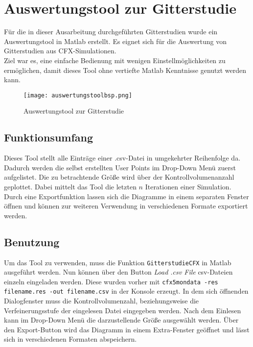 \chapter{Auswertungstool zur Gitterstudie}
\label{cha:auswertungstool}
Für die in dieser Ausarbeitung durchgeführten Gitterstudien wurde ein Auswertungstool in Matlab erstellt. Es eignet sich für die Auswertung von Gitterstudien aus CFX-Simulationen.\\
Ziel war es, eine einfache Bedienung mit wenigen Einstellmöglichkeiten zu ermöglichen, damit dieses Tool ohne vertiefte Matlab Kenntnisse genutzt werden kann.

\begin{figure}[htbp]
	\centering
	\label{fig:auswerungbsp}
	\texttt{[image: auswertungstoolbsp.png]}
	\caption{Auswertungstool zur Gitterstudie}
\end{figure}

\section{Funktionsumfang}
Dieses Tool stellt alle Einträge einer .csv-Datei in umgekehrter Reihenfolge da. Dadurch werden die selbst erstellten User Points im Drop-Down Menü zuerst aufgelistet. Die zu betrachtende Größe wird über der Kontrollvolumenanzahl geplottet. Dabei mittelt das Tool die letzten $n$ Iterationen einer Simulation. Durch eine Exportfunktion lassen sich die Diagramme in einem separaten Fenster öffnen und können zur weiteren Verwendung in verschiedenen Formate exportiert werden.

\section{Benutzung}
Um das Tool zu verwenden, muss die Funktion \texttt{GitterstudieCFX} in Matlab ausgeführt werden. Nun können über den Button \textit{Load .csv File} csv-Dateien einzeln eingeladen werden. Diese wurden vorher mit \texttt{cfx5mondata -res filename.res -out filename.csv} in der Konsole erzeugt. In dem sich öffnenden Dialogfenster muss die Kontrollvolumenzahl, beziehungsweise  die Verfeinerungsstufe der eingelesen Datei eingegeben werden. Nach dem Einlesen kann im Drop-Down Menü die darzustellende Größe ausgewählt werden. Über den Export-Button wird das Diagramm in einem Extra-Fenster geöffnet und lässt sich in verschiedenen Formaten abspeichern.
